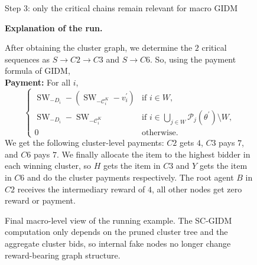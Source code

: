 \documentclass[sigconf]{aamas}
\theoremstyle{definition}
\theoremstyle{remark}
\newcommand{\SW}{\operatorname{SW}}
\begin{document}
\begin{figure}[t]
\centering
\begin{minipage}[t]{0.42\textwidth}
\centering
{}

\small Step 3: only the critical chains remain relevant for macro GIDM
\end{minipage}\hfill
\begin{minipage}[t]{0.54\textwidth}
\small
\textbf{Explanation of the run.} 

\medskip 

After obtaining the cluster graph, we determine the $2$ critical sequences as $S \rightarrow C2 \rightarrow C3$ and $S \rightarrow C6$. 
So, using the payment formula of GIDM, 
\\
\textbf{Payment:} For all $i$,
\[
\begin{cases}
\SW_{-D_i} - (\SW_{-\mathcal{C}_i^{K}} - v_i^\prime) & \text{if } i\in W,\\
\SW_{-D_i} - \SW_{-\mathcal{C}_i^{K}} & \text{if } i\in \bigcup_{j\in W}\mathcal{P}_j(\theta^\prime)\setminus W,\\
0 & \text{otherwise.}
\end{cases}
\]
We get the following cluster-level payments: $C2$ gets $4$, $C3$ pays $7$, and $C6$ pays $7$.
We finally allocate the item to the highest bidder in each winning cluster, so $H$ gets the item in $C3$ and $Y$ gets the item in $C6$ and do the cluster payments respectively.
The root agent $B$ in $C2$ receives the intermediary reward of $4$, all other nodes get zero reward or payment.


\end{minipage}
\caption{Final macro-level view of the running example. The SC-GIDM computation only depends on the pruned cluster tree and the aggregate cluster bids, so internal fake nodes no longer change reward-bearing graph structure.}
\label{fig:scgidmstepstwo}
\end{figure}
\end{document}

